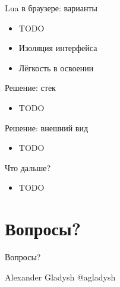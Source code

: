 \documentclass[handout]{beamer}
\begin{document}

\begin{frame}{Lua в браузере: варианты}

\begin{itemize}
\item TODO
\item Изоляция интерфейса
\item Лёгкость в освоении
\end{itemize}

\end{frame}


\begin{frame}{Решение: стек}

\begin{itemize}
\item TODO
\end{itemize}

\end{frame}


\begin{frame}{Решение: внешний вид}

\begin{itemize}
\item TODO
\end{itemize}

\end{frame}


\begin{frame}{Что дальше?}

\begin{itemize}
\item TODO
\end{itemize}

\end{frame}


\section{Вопросы?}


\begin{frame}{Вопросы?}

Alexander Gladysh\newline
@agladysh

\end{frame}

\end{document}
